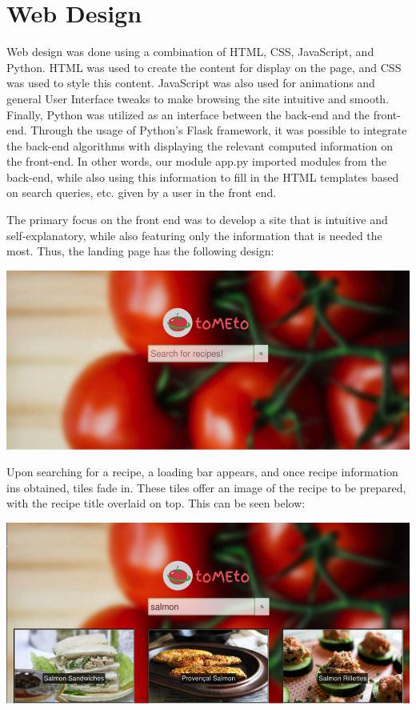 \documentclass{acm_proc_article-sp}
\begin{document}
\section{Web Design}

Web design was done using a combination of HTML, CSS, JavaScript, and Python. HTML was used to create the content for display on the page, and CSS was used to style this content. JavaScript was also used for animations and general User Interface tweaks to make browsing the site intuitive and smooth. Finally, Python was utilized as an interface between the back-end and the front-end. Through the usage of Python's Flask framework, it was possible to integrate the back-end algorithms with displaying the relevant computed information on the front-end. In other words, our module app.py imported modules from the back-end, while also using this information to fill in the HTML templates based on search queries, etc. given by a user in the front end. %

The primary focus on the front end was to develop a site that is intuitive and self-explanatory, while also featuring only the information that is needed the most. Thus, the landing page has the following design:

\includegraphics[scale=0.5]{p1.png}

Upon searching for a recipe, a loading bar appears, and once recipe information ins obtained, tiles fade in. These tiles offer an image of the recipe to be prepared, with the recipe title overlaid on top. This can be seen below:

\includegraphics[scale=0.5]{p2.png}
\end{document}
